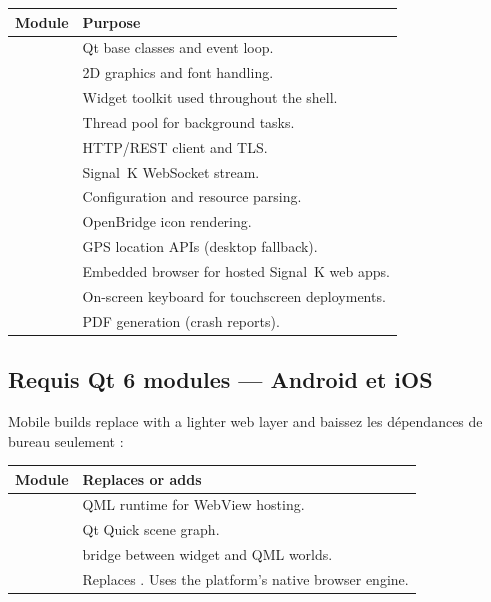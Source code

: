 \begin{longtable}{L{4.5cm}L{9.2cm}}
\toprule
{}
\color{white}\sffamily\bfseries Module &
\color{white}\sffamily\bfseries Purpose \\
\midrule
{}            & Qt base classes and event loop. \\
             & 2D graphics and font handling. \\
         & Widget toolkit used throughout the shell. \\
      & Thread pool for background tasks. \\
         & HTTP/REST client and TLS. \\
      & Signal~K WebSocket stream. \\
             & Configuration and resource parsing. \\
             & OpenBridge icon rendering. \\
     & GPS location APIs (desktop fallback). \\
& Embedded browser for hosted Signal~K web apps. \\
 & On-screen keyboard for touchscreen deployments. \\
    & PDF generation (crash reports). \\
\bottomrule
\end{longtable}

\subsection{Requis Qt 6 modules --- Android et iOS}

Mobile builds replace  with a lighter web layer and
baissez les dépendances de bureau seulement :

\begin{longtable}{L{4.5cm}L{9.2cm}}
\toprule
{}
\color{white}\sffamily\bfseries Module &
\color{white}\sffamily\bfseries Replaces or adds \\
\midrule
{}         & QML runtime for WebView hosting. \\
       & Qt Quick scene graph. \\
&  bridge between widget and QML worlds. \\
     & Replaces . Uses the platform's native browser engine. \\
\bottomrule
\end{longtable}

